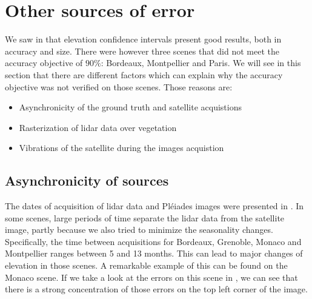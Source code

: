 \section{Other sources of error}\label{sec:other_errors}
We saw in  that elevation confidence intervals present good results, both in accuracy and size. There were however three scenes that did not meet the accuracy objective of $90\%$: Bordeaux, Montpellier and Paris. We will see in this section that there are different factors which can explain why the accuracy objective was not verified on those scenes. Those reasons are: 
\begin{itemize}
    \item Asynchronicity of the ground truth and satellite acquistions
    \item Rasterization of \acrshort{lidar} data over vegetation
    \item Vibrations of the satellite during the images acquistion
\end{itemize}

\subsection{Asynchronicity of sources}
The dates of acquisition of \acrshort{lidar} data and Pléiades images were presented in . In some scenes, large periods of time separate the \acrshort{lidar} data from the satellite image, partly because we also tried to minimize the seasonality changes. Specifically, the time between acquisitions for Bordeaux, Grenoble, Monaco and Montpellier ranges between 5 and 13 months. This can lead to major changes of elevation in those scenes. A remarkable example of this can be found on the Monaco scene. If we take a look at the errors on this scene in , we can see that there is a strong concentration of those errors on the top left corner of the image. 

